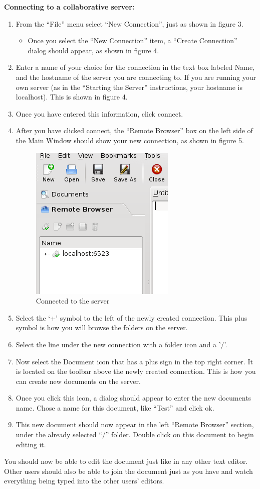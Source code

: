 \documentclass[11pt]{article}
\begin{document}
{\bf Connecting to a collaborative server:}\\
\begin{enumerate}
 \item From the ``File'' menu select ``New Connection'', just as shown in figure 3.
 \begin{itemize}
  \item Once you select the ``New Connection'' item, a ``Create Connection'' dialog should appear, as shown in figure 4.
 \end{itemize}
 \item Enter a name of your choice for the connection in the text box labeled Name, and the hostname of the server you are connecting to.  If you are running your own server (as in the ``Starting the Server'' instructions, your hostname is localhost).  This is shown in figure 4.
 \item Once you have entered this information, click connect.
 \item After you have clicked connect, the ``Remote Browser'' box on the left side of the Main Window should show your new connection, as shown in figure 5.
\begin{figure}[tbh]
\begin{center}
 \includegraphics[width=.4\textwidth]{kobbylocalhostconnection.png}
\end{center}
\caption{Connected to the server}
\end{figure}
 \item Select the `+' symbol to the left of the newly created connection.  This plus symbol is how you will browse the folders on the server.
 \item Select the line under the new connection with a folder icon and a '/'.
 \item Now select the Document icon that has a plus sign in the top right corner.  It is located on the toolbar above the newly created connection.  This is how you can create new documents on the server.
 \item Once you click this icon, a dialog should appear to enter the new documents name.  Chose a name for this document, like ``Test'' and click ok.
 \item This new document should now appear in the left ``Remote Browser'' section, under the already selected ``/'' folder.  Double click on this document to begin editing it.
\end{enumerate}

You should now be able to edit the document just like in any other text editor.  Other users should also be able to join the document just as you have and watch everything being typed into the other users' editors.
\end{document}
